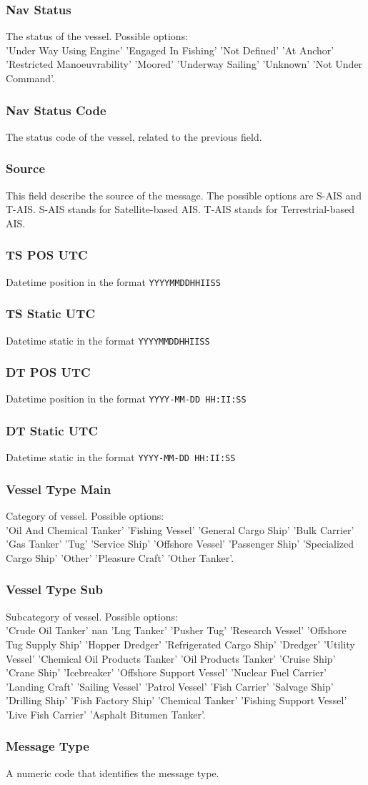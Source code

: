 \subsubsection{Nav Status}
    The status of the vessel. Possible options: \\'Under Way Using Engine' 'Engaged In Fishing' 'Not Defined' 'At Anchor' 'Restricted Manoeuvrability' 'Moored' 'Underway Sailing' 'Unknown' 'Not Under Command'.
\subsubsection{Nav Status Code}
    The status code of the vessel, related to the previous field.
\subsubsection{Source}
    This field describe the source of the message. The possible options are S-AIS and T-AIS.
    S-AIS stands for Satellite-based AIS.
    T-AIS stands for Terrestrial-based AIS.
\subsubsection{TS POS UTC}
    Datetime position in the format \verb|YYYYMMDDHHIISS|
\subsubsection{TS Static UTC}
    Datetime static in the format \verb|YYYYMMDDHHIISS|
\subsubsection{DT POS UTC}
    Datetime position in the format \verb|YYYY-MM-DD HH:II:SS|
\subsubsection{DT Static UTC}
    Datetime static in the format \verb|YYYY-MM-DD HH:II:SS|
\subsubsection{Vessel Type Main}
    Category of vessel. Possible options:\\ 'Oil And Chemical Tanker' 'Fishing Vessel' 'General Cargo Ship' 'Bulk Carrier' 'Gas Tanker' 'Tug' 'Service Ship' 'Offshore Vessel' 'Passenger Ship' 'Specialized Cargo Ship' 'Other' 'Pleasure Craft' 'Other Tanker'.
\subsubsection{Vessel Type Sub}
    Subcategory of vessel. Possible options:\\ 'Crude Oil Tanker' nan 'Lng Tanker' 'Pusher Tug' 'Research Vessel' 'Offshore Tug Supply Ship' 'Hopper Dredger' 'Refrigerated Cargo Ship' 'Dredger' 'Utility Vessel' 'Chemical Oil Products Tanker' 'Oil Products Tanker' 'Cruise Ship' 'Crane Ship' 'Icebreaker' 'Offshore Support Vessel' 'Nuclear Fuel Carrier' 'Landing Craft' 'Sailing Vessel' 'Patrol Vessel' 'Fish Carrier' 'Salvage Ship' 'Drilling Ship' 'Fish Factory Ship' 'Chemical Tanker' 'Fishing Support Vessel' 'Live Fish Carrier' 'Asphalt Bitumen Tanker'.
\subsubsection{Message Type}
    A numeric code that identifies the message type.